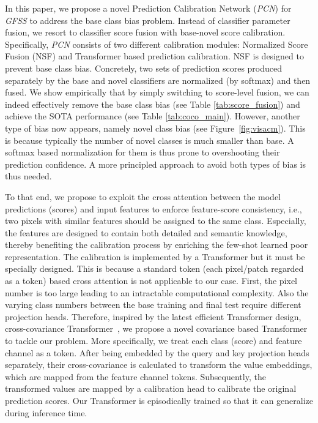 \documentclass[journal]{IEEEtran}
\begin{document}
In this paper, we propose a novel Prediction Calibration Network (\textit{PCN}) for \textit{GFSS} to address the base class bias problem. Instead of classifier parameter fusion, we resort to classifier score fusion  with base-novel score calibration. Specifically, \textit{PCN} consists of two different calibration modules: Normalized Score Fusion (NSF) and Transformer based prediction calibration. NSF is designed to prevent base class bias. Concretely, two sets of prediction scores produced separately by the base and novel classifiers are normalized (by softmax) and then fused. We show empirically that by simply switching to score-level fusion, we can indeed effectively remove the base class bias (see Table \ref{tab:score_fusion}) and achieve the SOTA performance (see Table \ref{tab:coco_main}). 
However, another type of bias now appears, namely novel class bias (see Figure~\ref{fig:visacm}). This is because typically the number of novel classes is much smaller than base. A softmax based normalization for them is thus prone to overshooting their prediction confidence. A more principled approach to avoid both types of bias is thus needed. 

To that end, we propose to exploit the  cross attention between the model predictions (scores) and input features to enforce feature-score consistency, i.e., two pixels with similar features should be assigned to the same class. 
Especially, the features are designed to contain both detailed and semantic knowledge, thereby benefiting the calibration process by enriching the few-shot learned poor representation.
The calibration is implemented by a Transformer but it must be specially designed.
This is because a standard token (each pixel/patch regarded as a token) based cross attention is not applicable to our case. First, the pixel number is too large leading to an intractable computational complexity. Also the varying class numbers between the base training and final test require different projection heads. Therefore, inspired by the latest efficient Transformer design, cross-covariance Transformer~\cite{el2021xcit}, we propose a novel covariance based Transformer to tackle our problem.
More specifically, we treat each class (score) and feature channel as a token. After being embedded by the query and key projection heads separately, their cross-covariance is calculated to transform the value embeddings, which are mapped from the feature channel tokens.
Subsequently, the transformed values are mapped by a calibration head to calibrate the original prediction scores. 
Our Transformer is episodically trained so that it can generalize during inference time. 
\end{document}
